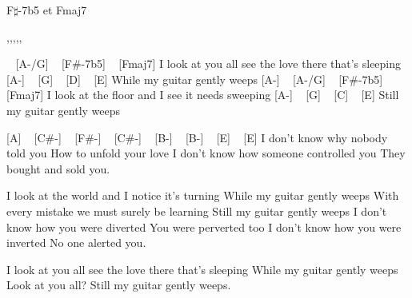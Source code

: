 
F$\sharp$-7b5 et Fmaj7
\begin{tabline}{1}{}{}{,,,,,}

\end{tabline}



\begin{guitar}
[A-] ~ [A-/G] ~ [F#-7b5] ~ [Fmaj7]
I look at you all see the love there that's sleeping
[A-] ~ [G] ~ [D] ~ [E]
While my guitar gently weeps
[A-] ~ [A-/G] ~ [F#-7b5] ~ [Fmaj7]
I look at the floor and I see it needs sweeping
[A-] ~ [G] ~ [C] ~ [E]
Still my guitar gently weeps

[A] ~ [C#-] ~ [F#-] ~ [C#-] ~ [B-] ~ [B-] ~ [E] ~ [E]
I don't know why nobody told you
How to unfold your love
I don't know how someone controlled you
They bought and sold you.

I look at the world and I notice it's turning
While my guitar gently weeps
With every mistake we must surely be learning
Still my guitar gently weeps
I don't know how you were diverted
You were perverted too
I don't know how you were inverted
No one alerted you.

I look at you all see the love there that's sleeping
While my guitar gently weeps
Look at you all?
Still my guitar gently weeps. 

\end{guitar}